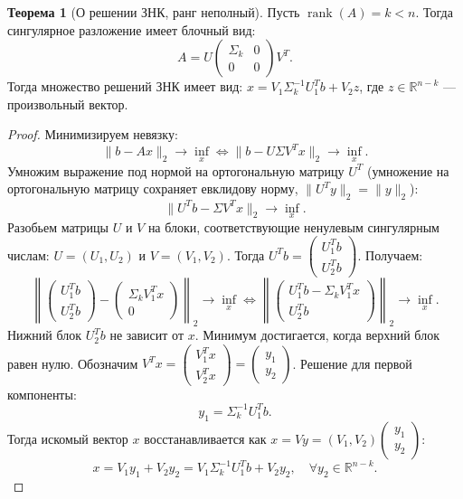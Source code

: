 \documentclass[12pt, a4paper]{article}
\theoremstyle{definition}
\newtheorem{theorem}{Теорема}
\begin{document}
\begin{theorem}[О решении ЗНК, ранг неполный]
Пусть $\operatorname{rank}(A) = k < n$. Тогда сингулярное разложение имеет блочный вид:
\[
A = U \begin{pmatrix} \Sigma_k & 0 \\ 0 & 0 \end{pmatrix} V^T.
\]
Тогда множество решений ЗНК имеет вид: $x = V_1 \Sigma_k^{-1} U_1^T b + V_2 z$, где $z \in \mathbb{R}^{n-k}$ --- произвольный вектор.
\end{theorem}
\begin{proof}
Минимизируем невязку:
\[
\|b - Ax\|_2 \to \inf_x \iff \|b - U \Sigma V^T x\|_2 \to \inf_x.
\]
Умножим выражение под нормой на ортогональную матрицу $U^T$ (умножение на ортогональную матрицу сохраняет евклидову норму, $\|U^T y\|_2 = \|y\|_2$):
\[
\|U^T b - \Sigma V^T x\|_2 \to \inf_x.
\]
Разобьем матрицы $U$ и $V$ на блоки, соответствующие ненулевым сингулярным числам: $U = (U_1, U_2)$ и $V = (V_1, V_2)$. Тогда $U^T b = \begin{pmatrix} U_1^T b \\ U_2^T b \end{pmatrix}$. Получаем:
\[
\left\| \begin{pmatrix} U_1^T b \\ U_2^T b \end{pmatrix} - \begin{pmatrix} \Sigma_k V_1^T x \\ 0 \end{pmatrix} \right\|_2 \to \inf_x \iff \left\| \begin{pmatrix} U_1^T b - \Sigma_k V_1^T x \\ U_2^T b \end{pmatrix} \right\|_2 \to \inf_x.
\]
Нижний блок $U_2^T b$ не зависит от $x$. Минимум достигается, когда верхний блок равен нулю. Обозначим $V^T x = \begin{pmatrix} V_1^T x \\ V_2^T x \end{pmatrix} = \begin{pmatrix} y_1 \\ y_2 \end{pmatrix}$. 
Решение для первой компоненты:
\[
y_1 = \Sigma_k^{-1} U_1^T b.
\]
Тогда искомый вектор $x$ восстанавливается как $x = V y = (V_1, V_2) \begin{pmatrix} y_1 \\ y_2 \end{pmatrix}$:
\[
x = V_1 y_1 + V_2 y_2 = V_1 \Sigma_k^{-1} U_1^T b + V_2 y_2, \quad \forall y_2 \in \mathbb{R}^{n-k}.
\]
\end{proof}
\end{document}
